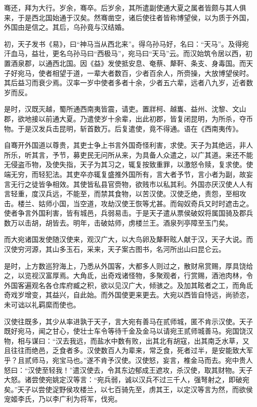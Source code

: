 \documentclass[]{article}
\begin{document}
骞还，拜为大行。岁余，骞卒。后岁余，其所遣副使通大夏之属者皆颇与其人俱来，于是西北国始通于汉矣。然骞凿空，诸后使往者皆称博望侯，以为质于外国，外国由是信之。其后，乌孙竟与汉结婚。

初，天子发书《易》，曰``神马当从西北来''。得乌孙马好，名曰：``天马''。及得宛汗血马，益壮，更名乌孙马曰``西极马''，宛马曰``天马''云。而汉始筑令居以西，初置酒泉郡，以通西北国。因《益》发使抵安息、奄蔡、犛靬、条支、身毒国。而天子好宛马，使者相望于道，一辈大者数百，少者百余人，所赍操，大放博望侯时。其后益习而衰少焉。汉率一岁中使者多者十余，少者五六辈，远者八九岁，近者数岁而反。

是时，汉既灭越，蜀所通西南夷皆震，请吏。置牂柯、越巂、益州、沈黎、文山郡，欲地接以前通大夏。乃遣使岁十余辈，出此初郡，皆复闭昆明，为所杀，夺币物。于是汉发兵击昆明，斩首数万。后复遣使，竟不得通。语在《西南夷传》。

自骞开外国道以尊贵，其吏士争上书言外国奇怪利害，求使。天子为其绝远，非人所乐，听其言，予节，募吏民无问所从来，为具备人众遣之，以广其道。来还不能无侵盗币物，及使失指，天子为其习之，辄复按致重罪，以激怒令赎，复求使。使端无穷，而轻犯法。其吏卒亦辄复盛推外国所有，言大者予节，言小者为副，故妄言无行之徒皆争相效。其使皆私县官赍物，欲贱市以私其利。外国亦厌汉使人人有言轻重，度汉兵远，不能至，而禁其食物，以苦汉使。汉使乏绝，责怨，至相攻击。楼兰、姑师小国，当空道，攻劫汉使王恢等尤甚。而匈奴奇兵又时时遮击之。使者争言外国利害，皆有城邑，兵弱易击。于是天子遣从票侯破奴将属国骑及郡兵数万以击胡，胡皆去。明年，击破姑师，虏楼兰王。酒泉列亭障至玉门矣。

而大宛诸国发使随汉使来，观汉广大，以大鸟卵及犛靬眩人献于汉，天子大说。而汉使穷河源，其山多玉石，采来，天子案古图书，名河所出山曰昆仑云。

是时，上方数巡狩海上，乃悉从外国客，大都多人则过之，散财帛赏赐，厚具饶给之，以览视汉富厚焉。大角氐，出奇戏诸怪物，多聚观者，行赏赐，酒池肉林，令外国客遍观名各仓库府臧之积，欲以见汉广大，倾骇之。及加其眩者之工，而角氐奇戏岁增变，其益兴，自此始。而外国使更来更去。大宛以西皆自恃远，尚骄恣，未可诎以礼羁縻而使也。

汉使往既多，其少从率进孰于天子，言大宛有善马在贰师城，匿不肯示汉使。天子既好宛马，闻之甘心，使壮士车令等待千金及金马以请宛王贰师城善马。宛国饶汉物，相与谋曰：``汉去我远，而盐水中数有败，出其北有胡寇，出其南乏水草，又且往往而绝邑，乏食者多。汉使数百人为辈来，常乏食，死者过半，是安能致大军乎？且贰师马，宛宝马也。''遂不肯予汉使。汉使怒，妄言，椎金马而去。宛中贵人怒曰：``汉使至轻我！''遣汉使去，令其东边郁成王遮攻，杀汉使，取其财物。天子大怒。诸尝使宛姚定汉等言：``宛兵弱，诚以汉兵不过三千人，强弩射之，即破宛矣。''天子以尝使浞野侯攻楼兰，以七百骑先至，虏其王，以定汉等言为然，而欲侯宠姬李氏，乃以李广利为将军，伐宛。
\end{document}
